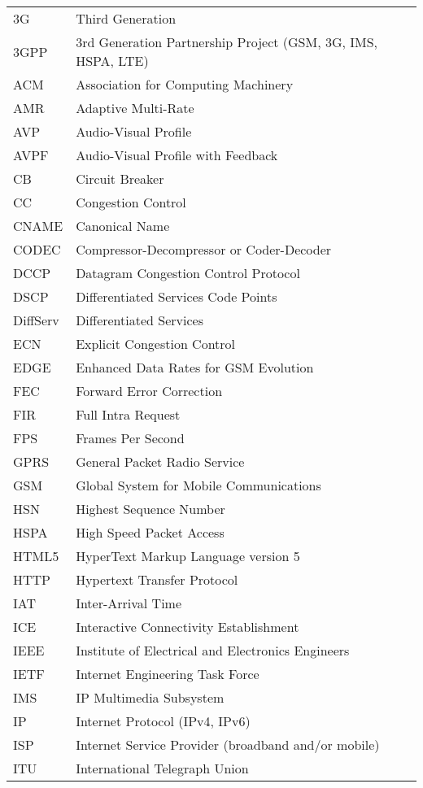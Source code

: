 \begin{longtable}{ll}
3G  	& Third Generation \\
3GPP 	& 3rd Generation Partnership Project (GSM, 3G, IMS, HSPA, LTE)\\
ACM 	& Association for Computing Machinery \\
AMR 	& Adaptive Multi-Rate \\
AVP 	& Audio-Visual Profile \\
AVPF	& Audio-Visual Profile with Feedback \\
CB  	& Circuit Breaker \\
CC  	& Congestion Control \\
CNAME	& Canonical Name \\
CODEC	& Compressor-Decompressor or Coder-Decoder \\
DCCP 	& Datagram Congestion Control Protocol \\
DSCP 	& Differentiated Services Code Points \\
DiffServ	& Differentiated Services \\
ECN  	& Explicit Congestion Control \\
EDGE 	& Enhanced Data Rates for GSM Evolution \\
FEC  	& Forward Error Correction \\
FIR 	& Full Intra Request \\
FPS 	& Frames Per Second \\
GPRS 	& General Packet Radio Service \\
GSM 	& Global System for Mobile Communications \\
HSN 	& Highest Sequence Number \\
HSPA 	& High Speed Packet Access \\
HTML5	& HyperText Markup Language version 5\\
HTTP 	& Hypertext Transfer Protocol \\
IAT  	& Inter-Arrival Time \\
ICE  	& Interactive Connectivity Establishment \\
IEEE 	& Institute of Electrical and Electronics Engineers \\
IETF	& Internet Engineering Task Force \\
IMS 	& IP Multimedia Subsystem \\
IP  	& Internet Protocol (IPv4, IPv6)\\
ISP 	& Internet Service Provider (broadband and/or mobile) \\
ITU 	& International Telegraph Union \\

\end{longtable}
